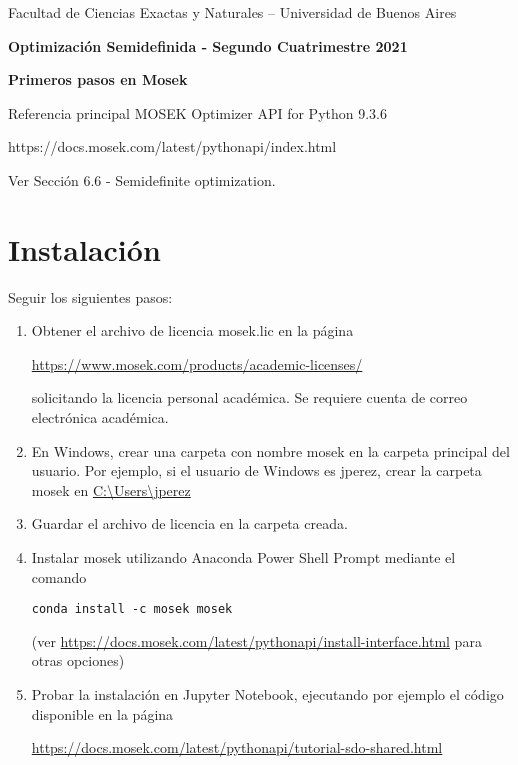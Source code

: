 \documentclass[11pt]{article}
\begin{document}
\begin{center}

{\small Facultad de Ciencias Exactas
y Naturales -- Universidad de Buenos Aires } \vskip 1cm

\textbf{{\large Optimización Semidefinida} - Segundo Cuatrimestre 2021}

\medskip\textbf{Primeros pasos en Mosek}
\end{center}

\medskip

Referencia principal MOSEK Optimizer API for Python 9.3.6

https://docs.mosek.com/latest/pythonapi/index.html

Ver Sección 6.6 - Semidefinite optimization.

\section{Instalación}
Seguir los siguientes pasos:

\begin{enumerate}
\item Obtener el archivo de licencia mosek.lic en la página

\url{https://www.mosek.com/products/academic-licenses/}

solicitando la licencia personal académica. Se requiere cuenta de correo electrónica académica.

\item En Windows, crear una carpeta con nombre mosek en la carpeta principal del usuario. Por ejemplo, si el usuario de Windows es jperez, crear la carpeta mosek en \url{C:\Users\jperez}

\item Guardar el archivo de licencia en la carpeta creada. 

\item Instalar mosek utilizando Anaconda Power Shell Prompt mediante el comando

\begin{lstlisting}
conda install -c mosek mosek
\end{lstlisting}

(ver \url{https://docs.mosek.com/latest/pythonapi/install-interface.html} para otras opciones)

\item Probar la instalación en Jupyter Notebook, ejecutando por ejemplo el código disponible en la página

\url{https://docs.mosek.com/latest/pythonapi/tutorial-sdo-shared.html}

\end{enumerate}
\end{document}
